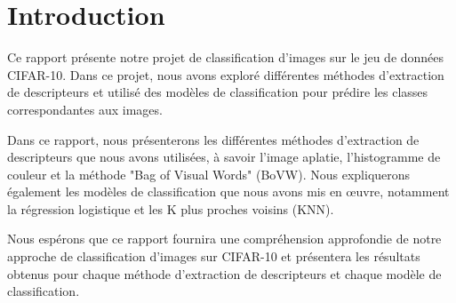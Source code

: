 \section{Introduction}\label{sec:intro}

Ce rapport présente notre projet de classification d'images sur le jeu de données CIFAR-10. Dans ce projet, nous avons exploré différentes méthodes d'extraction de descripteurs et utilisé des modèles de classification pour prédire les classes correspondantes aux images.

Dans ce rapport, nous présenterons les différentes méthodes d'extraction de descripteurs que nous avons utilisées, à savoir l'image aplatie, l'histogramme de couleur et la méthode "Bag of Visual Words" (BoVW). Nous expliquerons également les modèles de classification que nous avons mis en œuvre, notamment la régression logistique et les K plus proches voisins (KNN).

Nous espérons que ce rapport fournira une compréhension approfondie de notre approche de classification d'images sur CIFAR-10 et présentera les résultats obtenus pour chaque méthode d'extraction de descripteurs et chaque modèle de classification.
